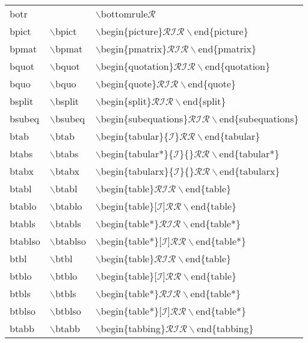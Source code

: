 \begin{longtable}{p{20mm}p{20mm}p{65mm}}
botr &  & $\backslash$bottomrule$\mathcal{R}$\\
bpict & $\backslash$bpict & $\backslash$begin\{picture\}$\mathcal{RIR}\backslash$end\{picture\}\\
bpmat & $\backslash$bpmat & $\backslash$begin\{pmatrix\}$\mathcal{RIR}\backslash$end\{pmatrix\}\\
bquot & $\backslash$bquot & $\backslash$begin\{quotation\}$\mathcal{RIR}\backslash$end\{quotation\}\\
bquo & $\backslash$bquo & $\backslash$begin\{quote\}$\mathcal{RIR}\backslash$end\{quote\}\\
bsplit & $\backslash$bsplit & $\backslash$begin\{split\}$\mathcal{RIR}\backslash$end\{split\}\\
bsubeq & $\backslash$bsubeq & $\backslash$begin\{subequations\}$\mathcal{RIR}\backslash$end\{subequations\}\\
btab & $\backslash$btab & $\backslash$begin\{tabular\}\{$\mathcal{I}$\}$\mathcal{RR}\backslash$end\{tabular\}\\
btabs & $\backslash$btabs & $\backslash$begin\{tabular*\}\{$\mathcal{I}$\}\{\}$\mathcal{RR}\backslash$end\{tabular*\}\\
btabx & $\backslash$btabx & $\backslash$begin\{tabularx\}\{$\mathcal{I}$\}\{\}$\mathcal{RR}\backslash$end\{tabularx\}\\
btabl & $\backslash$btabl & $\backslash$begin\{table\}$\mathcal{RIR}\backslash$end\{table\}\\
btablo & $\backslash$btablo & $\backslash$begin\{table\}[$\mathcal{I}$]$\mathcal{RR}\backslash$end\{table\}\\
btabls & $\backslash$btabls & $\backslash$begin\{table*\}$\mathcal{RIR}\backslash$end\{table*\}\\
btablso & $\backslash$btablso & $\backslash$begin\{table*\}[$\mathcal{I}$]$\mathcal{RR}\backslash$end\{table*\}\\
btbl & $\backslash$btbl & $\backslash$begin\{table\}$\mathcal{RIR}\backslash$end\{table\}\\
btblo & $\backslash$btblo & $\backslash$begin\{table\}[$\mathcal{I}$]$\mathcal{RR}\backslash$end\{table\}\\
btbls & $\backslash$btbls & $\backslash$begin\{table*\}$\mathcal{RIR}\backslash$end\{table*\}\\
btblso & $\backslash$btblso & $\backslash$begin\{table*\}[$\mathcal{I}$]$\mathcal{RR}\backslash$end\{table*\}\\
btabb & $\backslash$btabb & $\backslash$begin\{tabbing\}$\mathcal{RIR}\backslash$end\{tabbing\}\\

\end{longtable}
